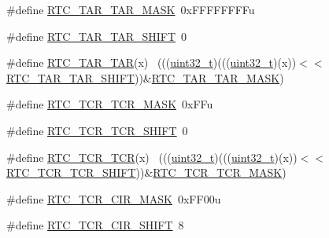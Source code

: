 \begin{DoxyCompactItemize}
\item 
\#define \hyperlink{group___r_t_c___register___masks_ga649a76416ad00079054bd866565dada2}{R\+T\+C\+\_\+\+T\+A\+R\+\_\+\+T\+A\+R\+\_\+\+M\+A\+SK}~0x\+F\+F\+F\+F\+F\+F\+F\+Fu
\item 
\#define \hyperlink{group___r_t_c___register___masks_ga9ec8791d91dc36f0f59a7705988f7278}{R\+T\+C\+\_\+\+T\+A\+R\+\_\+\+T\+A\+R\+\_\+\+S\+H\+I\+FT}~0
\item 
\#define \hyperlink{group___r_t_c___register___masks_ga817df24c688f5b9031ce69c919c9337f}{R\+T\+C\+\_\+\+T\+A\+R\+\_\+\+T\+AR}(x)                                                  ~(((\hyperlink{_p_e___types_8h_a33594304e786b158f3fb30289278f5af}{uint32\+\_\+t})(((\hyperlink{_p_e___types_8h_a33594304e786b158f3fb30289278f5af}{uint32\+\_\+t})(x))$<$$<$\hyperlink{group___r_t_c___register___masks_ga9ec8791d91dc36f0f59a7705988f7278}{R\+T\+C\+\_\+\+T\+A\+R\+\_\+\+T\+A\+R\+\_\+\+S\+H\+I\+FT}))\&\hyperlink{group___r_t_c___register___masks_ga649a76416ad00079054bd866565dada2}{R\+T\+C\+\_\+\+T\+A\+R\+\_\+\+T\+A\+R\+\_\+\+M\+A\+SK})
\item 
\#define \hyperlink{group___r_t_c___register___masks_ga48a96d1de8db1993bfac3ca9d6bdb227}{R\+T\+C\+\_\+\+T\+C\+R\+\_\+\+T\+C\+R\+\_\+\+M\+A\+SK}~0x\+F\+Fu
\item 
\#define \hyperlink{group___r_t_c___register___masks_ga0d8bc8c79b8010b8ebb94562428713fe}{R\+T\+C\+\_\+\+T\+C\+R\+\_\+\+T\+C\+R\+\_\+\+S\+H\+I\+FT}~0
\item 
\#define \hyperlink{group___r_t_c___register___masks_gae677a99c22f7ba8c9c872446e4d8dc09}{R\+T\+C\+\_\+\+T\+C\+R\+\_\+\+T\+CR}(x)                                                  ~(((\hyperlink{_p_e___types_8h_a33594304e786b158f3fb30289278f5af}{uint32\+\_\+t})(((\hyperlink{_p_e___types_8h_a33594304e786b158f3fb30289278f5af}{uint32\+\_\+t})(x))$<$$<$\hyperlink{group___r_t_c___register___masks_ga0d8bc8c79b8010b8ebb94562428713fe}{R\+T\+C\+\_\+\+T\+C\+R\+\_\+\+T\+C\+R\+\_\+\+S\+H\+I\+FT}))\&\hyperlink{group___r_t_c___register___masks_ga48a96d1de8db1993bfac3ca9d6bdb227}{R\+T\+C\+\_\+\+T\+C\+R\+\_\+\+T\+C\+R\+\_\+\+M\+A\+SK})
\item 
\#define \hyperlink{group___r_t_c___register___masks_ga8f198d1dbc7427e1dfabdc4e9f53f8e2}{R\+T\+C\+\_\+\+T\+C\+R\+\_\+\+C\+I\+R\+\_\+\+M\+A\+SK}~0x\+F\+F00u
\item 
\#define \hyperlink{group___r_t_c___register___masks_ga4b8c9ecf8ed798b8c0173ce122874c5e}{R\+T\+C\+\_\+\+T\+C\+R\+\_\+\+C\+I\+R\+\_\+\+S\+H\+I\+FT}~8
\item 

\end{DoxyCompactItemize}
